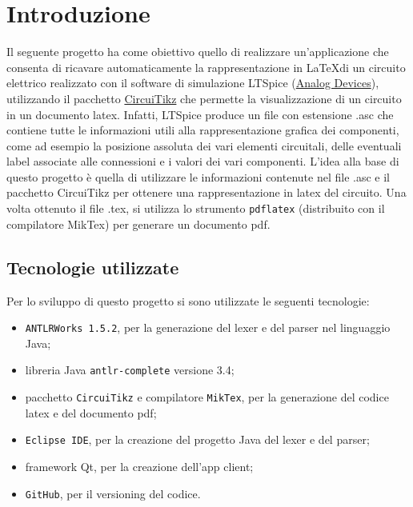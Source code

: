 \section{Introduzione}
Il seguente progetto ha come obiettivo quello di realizzare un'applicazione che consenta di ricavare automaticamente la rappresentazione in \LaTeX \;di un circuito elettrico realizzato con il software di simulazione LTSpice (\href{https://www.analog.com/en/design-center/design-tools-and-calculators/ltspice-simulator.html}{Analog Devices}), utilizzando il pacchetto \href{https://it.overleaf.com/learn/latex/CircuiTikz_package}{CircuiTikz} che permette la visualizzazione di un circuito in un documento latex. Infatti, LTSpice produce un file con estensione .asc che contiene tutte le informazioni utili alla rappresentazione grafica dei componenti, come ad esempio la posizione assoluta dei vari elementi circuitali, delle eventuali label associate alle connessioni e i valori dei vari componenti. L'idea alla base di questo progetto è quella di utilizzare le informazioni contenute nel file .asc e il pacchetto CircuiTikz per ottenere una rappresentazione in latex del circuito. Una volta ottenuto il file .tex, si utilizza lo strumento \texttt{pdflatex} (distribuito con il compilatore MikTex) per generare un documento pdf.
\subsection{Tecnologie utilizzate}
Per lo sviluppo di questo progetto si sono utilizzate le seguenti tecnologie:
\begin{itemize}
	\item \texttt{ANTLRWorks 1.5.2}, per la generazione del lexer e del parser nel linguaggio Java;
	\item libreria Java \texttt{antlr-complete} versione 3.4;
	\item pacchetto \texttt{CircuiTikz} e compilatore \texttt{MikTex}, per la generazione del codice latex e del documento pdf;
	\item \texttt{Eclipse IDE}, per la creazione del progetto Java del lexer e del parser;
	\item framework Qt, per la creazione dell'app client;
	\item \texttt{GitHub}, per il versioning del codice.
\end{itemize}
